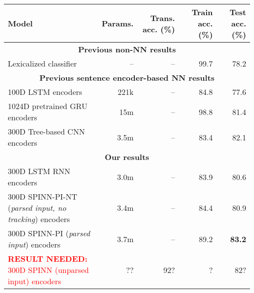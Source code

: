 \documentclass[11pt]{article}
\newcommand\result[1]{\textcolor{red}{\textbf{RESULT NEEDED:} #1}}
\def\ii#1{\textit{#1}}
\begin{document}
\begin{table*}[t]
  \centering\small
  \begin{tabular}{lrrrr} 
    \toprule
Model                   & Params.    & Trans. acc. (\%)  &   Train acc. (\%)  &   Test acc. (\%) \\
\midrule
\multicolumn{5}{c}{\textbf{Previous non-NN results}}\\
Lexicalized classifier \citep{snli:emnlp2015}
                        & --                & --                    &   99.7   &   78.2      \\
\midrule
\multicolumn{5}{c}{\textbf{Previous sentence encoder-based NN results}}\\
100D LSTM encoders \citep{snli:emnlp2015}
                        & 221k               & --               &   84.8   &   77.6      \\
1024D pretrained GRU encoders \citep{DBLP:journals/corr/VendrovKFU15}
                        & 15m                & --              &   98.8   &   81.4       \\
300D Tree-based CNN encoders \citep{mou2015recognizing}
                        & 3.5m                & --             &   83.4   &   82.1       \\
\midrule
\multicolumn{5}{c}{\textbf{Our results}}\\
300D LSTM RNN encoders         & 3.0m                  & --                &   83.9      &   80.6       \\
300D SPINN-PI-NT (\ii{parsed input, no tracking}) encoders
                        & 3.4m                  & --                &   84.4      &   80.9       \\
300D SPINN-PI (\ii{parsed input}) encoders
                        & 3.7m                  & --                &   89.2      &   \textbf{83.2}       \\
\result{300D SPINN (unparsed input) encoders }
                        & ??                  & 92?           &   ?    &   82?      \\          

\end{tabular}
\end{table*}
\end{document}

